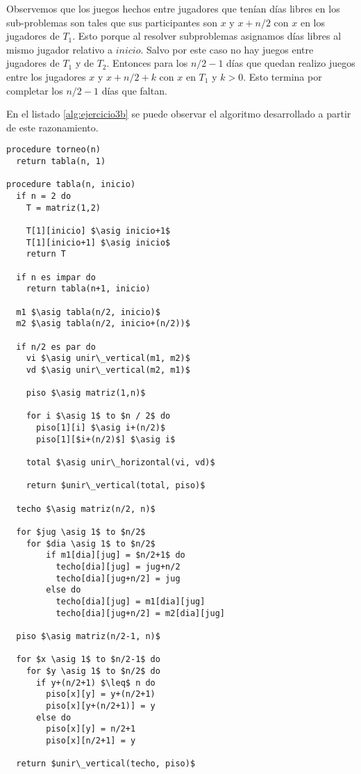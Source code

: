 \documentclass{article}
\newcommand{\asig}{\ensuremath{\leftarrow}}
\begin{document}
\begin{itemize}
Observemos que los juegos hechos entre jugadores que tenían días libres en los sub-problemas
son tales que sus participantes son $x$ y $x+n/2$ con $x$ en los jugadores de $T_1$. Esto
porque al resolver subproblemas asignamos días libres al mismo jugador relativo a $inicio$.
Salvo por este caso no hay juegos entre jugadores de $T_1$ y de $T_2$.
Entonces para los $n/2-1$ días que quedan realizo juegos entre los jugadores $x$ y $x+n/2+k$
con $x$ en $T_1$ y $k > 0$. Esto termina por completar los $n/2-1$ días que faltan.

En el listado \ref{alg:ejercicio3b} se puede observar
el algoritmo desarrollado a partir de este razonamiento.

\begin{lstlisting}[caption={Solución al ejercicio 3},label=alg:ejercicio3b]
procedure torneo(n)
  return tabla(n, 1)

procedure tabla(n, inicio)
  if n = 2 do
    T = matriz(1,2)

    T[1][inicio] $\asig inicio+1$
    T[1][inicio+1] $\asig inicio$
    return T

  if n es impar do
    return tabla(n+1, inicio)

  m1 $\asig tabla(n/2, inicio)$
  m2 $\asig tabla(n/2, inicio+(n/2))$

  if n/2 es par do
    vi $\asig unir\_vertical(m1, m2)$
    vd $\asig unir\_vertical(m2, m1)$

    piso $\asig matriz(1,n)$

    for i $\asig 1$ to $n / 2$ do
      piso[1][i] $\asig i+(n/2)$
      piso[1][$i+(n/2)$] $\asig i$

    total $\asig unir\_horizontal(vi, vd)$

    return $unir\_vertical(total, piso)$

  techo $\asig matriz(n/2, n)$

  for $jug \asig 1$ to $n/2$
    for $dia \asig 1$ to $n/2$
        if m1[dia][jug] = $n/2+1$ do
          techo[dia][jug] = jug+n/2
          techo[dia][jug+n/2] = jug
        else do
          techo[dia][jug] = m1[dia][jug]
          techo[dia][jug+n/2] = m2[dia][jug]

  piso $\asig matriz(n/2-1, n)$

  for $x \asig 1$ to $n/2-1$ do
    for $y \asig 1$ to $n/2$ do
      if y+(n/2+1) $\leq$ n do
        piso[x][y] = y+(n/2+1)
        piso[x][y+(n/2+1)] = y
      else do
        piso[x][y] = n/2+1
        piso[x][n/2+1] = y

  return $unir\_vertical(techo, piso)$

\end{lstlisting}

\end{itemize}
\end{document}
